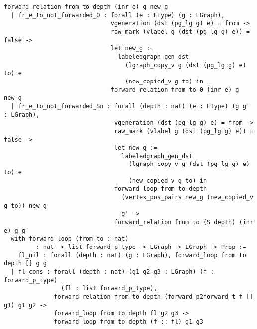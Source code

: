 \begin{lstlisting}[basicstyle=\normalfont\tiny\tt]
                        forward_relation from to depth (inr e) g new_g
  | fr_e_to_not_forwarded_O : forall (e : EType) (g : LGraph),
                              vgeneration (dst (pg_lg g) e) = from ->
                              raw_mark (vlabel g (dst (pg_lg g) e)) = false ->
                              let new_g :=
                                labeledgraph_gen_dst
                                  (lgraph_copy_v g (dst (pg_lg g) e) to) e
                                  (new_copied_v g to) in
                              forward_relation from to 0 (inr e) g new_g
  | fr_e_to_not_forwarded_Sn : forall (depth : nat) (e : EType) (g g' : LGraph),
                               vgeneration (dst (pg_lg g) e) = from ->
                               raw_mark (vlabel g (dst (pg_lg g) e)) = false ->
                               let new_g :=
                                 labeledgraph_gen_dst
                                   (lgraph_copy_v g (dst (pg_lg g) e) to) e
                                   (new_copied_v g to) in
                               forward_loop from to depth
                                 (vertex_pos_pairs new_g (new_copied_v g to)) new_g
                                 g' ->
                               forward_relation from to (S depth) (inr e) g g'
  with forward_loop (from to : nat)
         : nat -> list forward_p_type -> LGraph -> LGraph -> Prop :=
    fl_nil : forall (depth : nat) (g : LGraph), forward_loop from to depth [] g g
  | fl_cons : forall (depth : nat) (g1 g2 g3 : LGraph) (f : forward_p_type)
                (fl : list forward_p_type),
              forward_relation from to depth (forward_p2forward_t f [] g1) g1 g2 ->
              forward_loop from to depth fl g2 g3 ->
              forward_loop from to depth (f :: fl) g1 g3
\end{lstlisting}